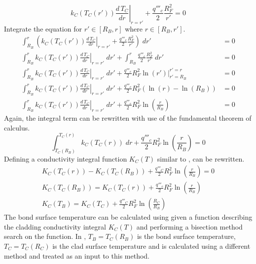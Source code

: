       \begin{equation}
        \left. k_C(T_C(r')) \frac{d\,T_C}{dr} \right|_{r=r'} + 
          \frac{q'''_c}{2} \frac{R_F^2}{r'} = 0
      \end{equation}
      Integrate the equation for $r' \in [R_B,r]$ where $r \in [R_B,r']$.
      \begin{align}
        \int_{R_B}^r \left( \left. k_C(T_C(r')) \frac{d\,T_C}{dr} \right|_{r=r'}
          + \frac{q'''_c}{2} \frac{R_F^2}{r'} \right) \; dr' &= 0 \\
        \int_{R_B}^r \left. k_C(T_C(r')) \frac{d\,T_C}{dr} \right|_{r=r'} \; dr'
          + \int_{R_B}^r \frac{q'''_c}{2} \frac{R_F^2}{r'} \; dr' &= 0 \\
        \int_{R_B}^r \left. k_C(T_C(r')) \frac{d\,T_C}{dr} \right|_{r=r'} \; dr'
          + \frac{q'''_c}{2} R_F^2 \left. \ln(r') \right|_{r'=R_B}^{r'=r} &= 0\\
        \int_{R_B}^r \left. k_C(T_C(r')) \frac{d\,T_C}{dr} \right|_{r=r'} \; dr'
          + \frac{q'''_c}{2} R_F^2 (\ln(r) - \ln(R_B)) &= 0\\
        \int_{R_B}^r \left. k_C(T_C(r')) \frac{d\,T_C}{dr} \right|_{r=r'} \; dr'
          + \frac{q'''_c}{2} R_F^2 \ln\left(\frac{r}{R_B}\right) &= 0
      \end{align}
      Again, the integral term can be rewritten with use of the fundamental
      theorem of calculus.
      \begin{equation}
        \label{eq:clad_integral}
        \int_{T_C(R_B)}^{T_C(r)} k_C(T_C(r)) \; dr +
          \frac{q'''_c}{2} R_F^2 \ln\left(\frac{r}{R_B}\right) = 0
      \end{equation}
      Defining a conductivity integral function $K_C(T)$ similar to
      ,  can be rewritten.
      \begin{gather}
        K_C(T_C(r)) - K_C(T_C(R_B)) + \frac{q'''_C}{2} R_F^2
          \ln\left(\frac{r}{R_B}\right) = 0 \\
        \label{eq:tclad_r}
        K_C(T_C(R_B)) = K_C(T_C(r)) + \frac{q'''_c}{2} R_F^2
          \ln\left(\frac{r}{R_B}\right) \\
        \label{eq:ktb}
        K_C(T_B) = K_C(T_C) + \frac{q'''_C}{2} R_F^2
          \ln\left(\frac{R_C}{R_B}\right) 
      \end{gather}
      The bond surface temperature can be calculated using  given a
      function describing the cladding conductivity integral $K_C(T)$ and
      performing a bisection method search on the function. In ,
      $T_B = T_C(R_B)$ is the bond surface temperature, $T_C=T_C(R_C)$ is the
      clad surface temperature and is calculated using a different method and
      treated as an input to this method.  

